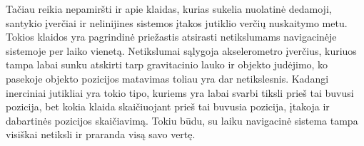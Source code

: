 Tačiau reikia nepamiršti ir apie klaidas, kurias sukelia nuolatinė dedamoji, santykio įverčiai ir nelinijines sistemos įtakos jutiklio verčių nuskaitymo metu. Tokios klaidos yra pagrindinė priežastis atsirasti netikslumams navigacinėje sistemoje per laiko vienetą. Netikslumai sąlygoja akselerometro įverčius, kuriuos tampa labai sunku atskirti tarp gravitacinio lauko ir objekto judėjimo, ko pasekoje objekto pozicijos matavimas toliau yra dar netikslesnis. Kadangi inerciniai jutikliai yra tokio tipo, kuriems yra labai svarbi tiksli prieš tai buvusi pozicija, bet kokia klaida skaičiuojant prieš tai buvusia pozicija, įtakoja ir dabartinės pozicijos skaičiavimą. Tokiu būdu, su laiku navigacinė sistema tampa visiškai netiksli ir praranda visą savo vertę.